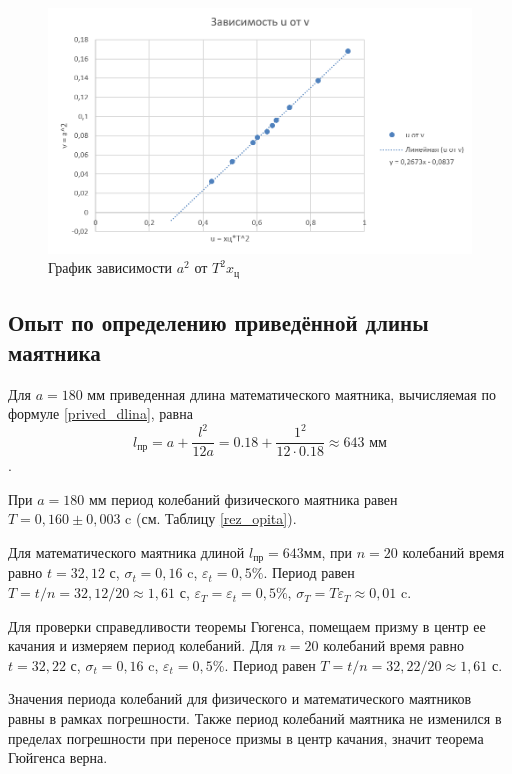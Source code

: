 \documentclass[a4paper,12pt]{article}
\begin{document}
\begin{figure}[h]
\includegraphics[width=1\textwidth]{graph-2.png}
\caption{График зависимости $a^2$ от $T^2x_\text{ц}$}
\label{graph-2}
\end{figure}


\subsection{Опыт по определению приведённой длины маятника}

Для $a = 180 \text{ мм}$ приведенная длина математического маятника, вычисляемая по формуле \eqref{prived_dlina}, равна
\[ l_{\text{пр}} = a + \dfrac{l^2}{12a} = 0.18 + \dfrac{1^2}{12 \cdot 0.18} \approx 643  \text{ мм} \].


При $a = 180$ мм период колебаний физического маятника равен $T = 0,160 \pm 0,003$ c (см. Таблицу \eqref{rez_opita}).


Для математического маятника длиной $l_{\text{пр}} = 643 \text{мм}$, при $n = 20$ колебаний время равно $t = 32,12$ с, $\sigma_t = 0,16$ c, $\varepsilon_t = 0,5 \%$. Период равен $T = t/n = 32,12/20 \approx 1,61$ с, $\varepsilon_T = \varepsilon_t = 0,5 \%$, $\sigma_T = T\varepsilon_T \approx 0,01 $ c.


Для проверки справедливости теоремы Гюгенса, помещаем призму в центр ее качания и измеряем период колебаний. Для $n = 20$ колебаний время равно $t = 32,22$ с, $\sigma_t = 0,16$ c, $\varepsilon_t = 0,5 \%$. Период равен $T = t/n = 32,22/20 \approx 1,61$ с.


Значения периода колебаний для физического и математического маятников равны в рамках погрешности. Также период колебаний маятника не изменился в пределах погрешности при переносе призмы в центр качания, значит теорема Гюйгенса верна.
\end{document}

